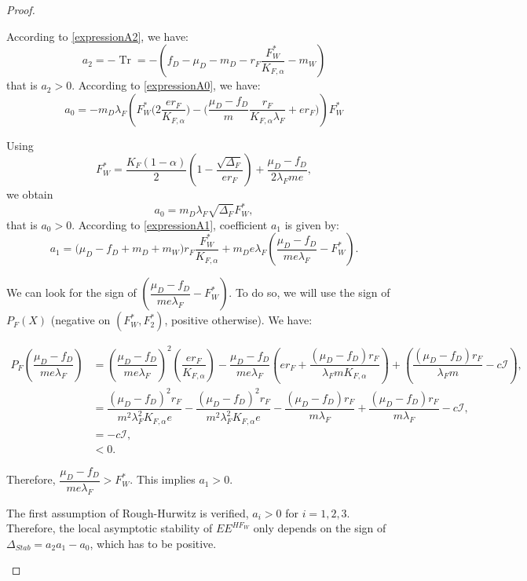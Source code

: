 \documentclass{article}
\newcommand{\lfw}{\lambda_{F}}
\newcommand{\lfw}{\lambda_{F}}
\DeclareMathOperator{\Tr}{Tr}
\begin{document}
\begin{proof}
\begin{itemize}
According to \eqref{expressionA2}, we have:
\begin{equation*}
a_2 = - \Tr = -(f_D - \mu_D - m_D - r_F \dfrac{F_W^*}{K_{F, \alpha}} - m_W)
\end{equation*}
that is $a_2>0$. According to \eqref{expressionA0}, we have:
\begin{equation*}
a_0 = - m_D \lfw \left( F_W^* \Big(2 \dfrac{e r_F}{K_{F, \alpha}} \Big) - \Big(\dfrac{\mu_D - f_D}{m} \dfrac{r_F}{K_{F, \alpha} \lfw} + er_F \Big) \right) F_W^*
\end{equation*}

Using
\begin{equation*}
F_W^* = \dfrac{K_F(1-\alpha)}{2}\left(1 - \dfrac{\sqrt{\Delta_F}}{er_F}\right) + \dfrac{\mu_D - f_D}{2\lfw m e},
\end{equation*}
we obtain
\begin{equation*}
a_0 = m_D \lfw \sqrt{\Delta_F}  F^*_{W},
\end{equation*}
that is $a_0>0$. According to \eqref{expressionA1}, coefficient $a_1$ is given by:
\begin{equation*}
a_1 = \big( \mu_D -f_D + m_D + m_W) r_F \dfrac{F^*_W}{K_{F, \alpha}}   + m_D e\lfw   \left(\dfrac{\mu_D - f_D}{m e\lfw} - F^*_W \right).
\end{equation*}

We can look for the sign of $\left(\dfrac{\mu_D -f_D}{m e\lfw} - F^*_{W}\right)$. To do so, we will use the sign of $P_F(X)$ (negative on $(F^*_W, F^*_2)$, positive otherwise). We have:

\begin{align*}
P_F \left(\dfrac{\mu_D-f_D}{m e\lfw} \right) &= \left(\dfrac{\mu_D-f_D}{m e\lfw} \right)^2 \left(\dfrac{er_F}{K_{F, \alpha}} \right) - \dfrac{\mu_D-f_D}{m e\lfw} \left(er_F + \dfrac{(\mu_D -f_D) r_F}{\lfw m K_{F, \alpha}} \right) + \left(\dfrac{(\mu_D-f_D) r_F}{\lfw m} - c\mathcal{I}\right), \\
&= \dfrac{(\mu_D-f_D)^2 r_F}{m^2 \lfw^2 K_{F, \alpha} e} - \dfrac{(\mu_D-f_D)^2 r_F}{m^2 \lfw^2 K_{F, \alpha} e} - \dfrac{(\mu_D-f_D) r_F}{m \lfw} + \dfrac{(\mu_D-f_D) r_F}{m \lfw} - c\mathcal{I}, \\
&= - c\mathcal{I},\\
& < 0.
\end{align*}

Therefore, $\dfrac{\mu_D - f_D}{m e\lfw} > F^*_{W}$. This implies $a_1 > 0$.

The first assumption of Rough-Hurwitz is verified, $a_i > 0$ for $i=1,2,3$. Therefore, the local asymptotic stability of $EE^{HF_W}$ only depends on the sign of $\Delta_{Stab}= a_2 a_1 - a_0$, which has to be positive.

\end{itemize}





\end{proof}
\end{document}
